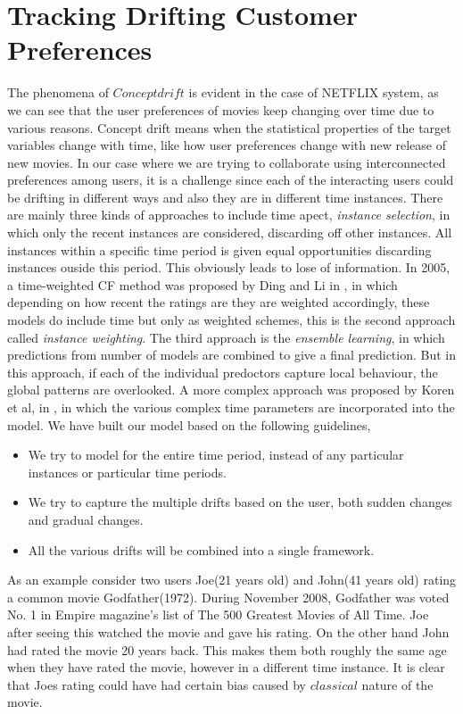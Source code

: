 \section{Tracking Drifting Customer Preferences}
The phenomena of $Concept drift$ is evident in the case of NETFLIX system, as we
can see that the user preferences of movies keep changing over time due to
various reasons. Concept drift means when the statistical properties of the
target variables change with time, like how user preferences change with new
release of new movies. In our case where we are trying to collaborate using
interconnected preferences among users, it is a challenge since each of the
interacting users could be drifting in different ways and also they are in
different time instances. There are mainly three kinds of approaches to include
time apect, \emph{instance selection}, in which only the recent instances are
considered, discarding off other instances. All instances within a specific time
period is given equal opportunities discarding instances ouside this period.
This obviously leads to lose of information.  In 2005, a time-weighted CF method
was proposed by Ding and Li in \cite{Ding:2005:TWC:1099554.1099689}, in
which depending on how recent the ratings are they are weighted accordingly,
these models do include time but only as weighted schemes, this is the second
approach called \emph{instance weighting}. The third approach is the
\emph{ensemble learning}, in which predictions from number of models are
combined to give a final prediction. But in this approach, if each of the
individual predoctors capture local behaviour, the global patterns are
overlooked.  A more complex approach was proposed by Koren et al, in
\cite{Koren:2010:CFT:1721654.1721677}, in
which the various complex time parameters are incorporated into the model.
We have built our model based on the following guidelines, \\
\begin{itemize}
  \item We try to model for the entire time period, instead of any particular
instances or particular time periods.
  \item We try to capture the multiple drifts based on the user, both sudden
changes and gradual changes.
  \item All the various drifts will be combined into a single framework.
\end{itemize}

\begin{example}
 As an example consider two users Joe(21 years old) and John(41 years old)
rating a common movie Godfather(1972). During November 2008, Godfather was voted
No. 1 in Empire magazine's list of The 500 Greatest Movies of All Time. Joe
after seeing this watched the movie and gave his rating. On the other hand John
had rated the movie 20 years back. This makes them both roughly the same age
when they have rated the movie, however in a different time instance. It is
clear that Joes rating could have had certain bias caused by $classical$ nature
of the movie.
\end{example}


